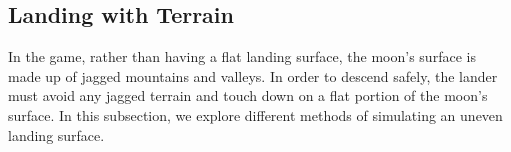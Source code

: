 \documentclass{article}
\begin{document}
\subsection{Landing with Terrain}
\label{subsec:Terrain}
In the game, rather than having a flat landing surface, the moon's surface is made up of jagged mountains and valleys. In order to descend safely, the lander must avoid any jagged terrain and touch down on a flat portion of the moon's surface. In this subsection, we explore different methods of simulating an uneven landing surface.
\end{document}
